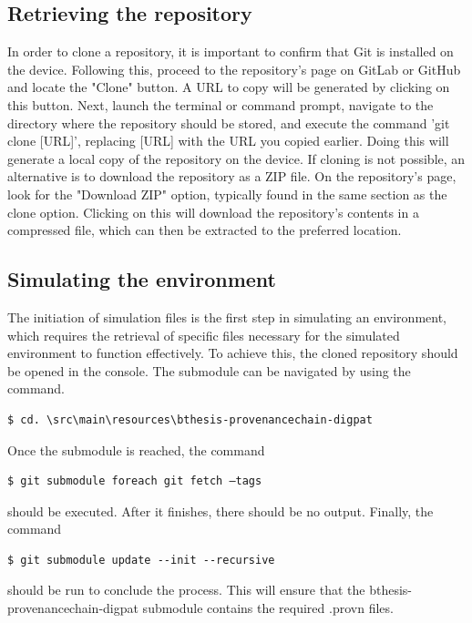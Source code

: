 \documentclass[
  digital,     %
  oneside,     %
  nosansbold,  %
  nocolorbold, %
  lof,         %
  lot,         %
]{fithesis4}
\begin{document}
\subsection{Retrieving the repository}
In order to clone a repository, it is important to confirm that Git is installed on the device. Following this, proceed to the repository's page on GitLab or GitHub and locate the "Clone" button. A URL to copy will be generated by clicking on this button. Next, launch the terminal or command prompt, navigate to the directory where the repository should be stored, and execute the command 'git clone [URL]', replacing [URL] with the URL you copied earlier. Doing this will generate a local copy of the repository on the device. If cloning is not possible, an alternative is to download the repository as a ZIP file. On the repository's page, look for the "Download ZIP" option, typically found in the same section as the clone option. Clicking on this will download the repository's contents in a compressed file, which can then be extracted to the preferred location.

\subsection{Simulating the environment}
The initiation of simulation files is the first step in simulating an environment, which requires the retrieval of specific files necessary for the simulated environment to function effectively. To achieve this, the cloned repository should be opened in the console. The submodule can be navigated by using the command.

\begin{verbatim}
$ cd. \src\main\resources\bthesis-provenancechain-digpat  
\end{verbatim}

Once the submodule is reached, the command 

\begin{verbatim}
$ git submodule foreach git fetch –tags
\end{verbatim}

should be executed. After it finishes, there should be no output. Finally, the command

\begin{verbatim}
$ git submodule update --init --recursive  
\end{verbatim}

should be run to conclude the process. This will ensure that the bthesis-provenancechain-digpat submodule contains the required .provn files.
\end{document}
